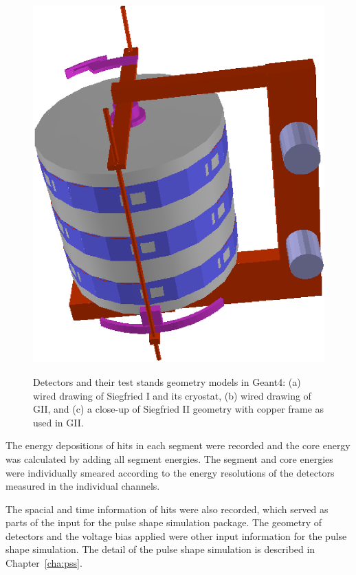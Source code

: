 \begin{figure}[tbhp]
{\includegraphics[height=0.3\textheight,clip]{SIIsolid}}
\caption{Detectors and their test stands geometry models in Geant4: (a) wired drawing of Siegfried I and its cryostat, (b) wired drawing of GII, and (c) a close-up of Siegfried II geometry with copper frame as used in GII.}
\label{fig:ph:sim}
\end{figure}

The energy depositions of hits in each segment were recorded and the core energy was calculated by adding all segment energies. The segment and core energies were individually smeared according to the energy resolutions of the detectors measured in the individual channels.

The spacial and time information of hits were also recorded, which served as parts of the input for the pulse shape simulation package. The geometry of detectors and the voltage bias applied were other input information for the pulse shape simulation. The detail of the pulse shape simulation is described in Chapter~\ref{cha:pss}.
 

